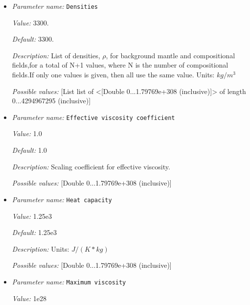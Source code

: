 \begin{itemize}
{\it Default:} 117


{\it Description:} ($\tau_0$). Units: $Pa$


{\it Possible values:} [Double 0...1.79769e+308 (inclusive)]
\item {\it Parameter name:} {\tt Densities}
\label{parameters:Material model/Morency and Doin/Densities}


{\it Value:} 3300.


{\it Default:} 3300.


{\it Description:} List of densities, $\rho$, for background mantle and compositional fields,for a total of N+1 values, where N is the number of compositional fields.If only one values is given, then all use the same value.  Units: $kg / m^3$


{\it Possible values:} [List list of <[Double 0...1.79769e+308 (inclusive)]> of length 0...4294967295 (inclusive)]
\item {\it Parameter name:} {\tt Effective viscosity coefficient}
\label{parameters:Material model/Morency and Doin/Effective viscosity coefficient}


{\it Value:} 1.0


{\it Default:} 1.0


{\it Description:} Scaling coefficient for effective viscosity.


{\it Possible values:} [Double 0...1.79769e+308 (inclusive)]
\item {\it Parameter name:} {\tt Heat capacity}
\label{parameters:Material model/Morency and Doin/Heat capacity}


{\it Value:} 1.25e3


{\it Default:} 1.25e3


{\it Description:} Units: $J / (K * kg)$


{\it Possible values:} [Double 0...1.79769e+308 (inclusive)]
\item {\it Parameter name:} {\tt Maximum viscosity}
\label{parameters:Material model/Morency and Doin/Maximum viscosity}


{\it Value:} 1e28



\end{itemize}
